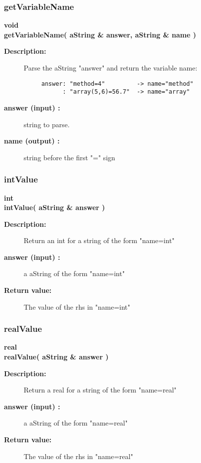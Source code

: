 \subsubsection{getVariableName}
 
\newlength{\NameListIncludeArgIndent}
\begin{flushleft} \textbf{%
void  \\ 
\settowidth{\NameListIncludeArgIndent}{getVariableName(}%
getVariableName( aString \& answer, aString \& name )
}\end{flushleft}
\begin{description}
\item[{\bf Description:}] 
   Parse the aString "answer" and return the variable name:
 \begin{verbatim}
     answer: "method=4"         -> name="method"
           : "array(5,6)=56.7"  -> name="array"
 \end{verbatim}
\item[{\bf answer (input) :}]  string to parse.
\item[{\bf name (output) :}]  string before the first "=" sign
\end{description}
\subsubsection{intValue}
 
\begin{flushleft} \textbf{%
int  \\ 
\settowidth{\NameListIncludeArgIndent}{intValue(}%
intValue( aString \& answer )
}\end{flushleft}
\begin{description}
\item[{\bf Description:}] 
  Return an int for a string of the form "name=int"
\item[{\bf answer (input) :}]  a aString of the form "name=int"
\item[{\bf Return value:}]  The value of the rhs in "name=int"
\end{description}
\subsubsection{realValue}
 
\begin{flushleft} \textbf{%
real  \\ 
\settowidth{\NameListIncludeArgIndent}{realValue(}%
realValue( aString \& answer )
}\end{flushleft}
\begin{description}
\item[{\bf Description:}] 
  Return a real for a string of the form "name=real"
\item[{\bf answer (input) :}]  a aString of the form "name=real"
\item[{\bf Return value:}]  The value of the rhs in "name=real"
\end{description}
